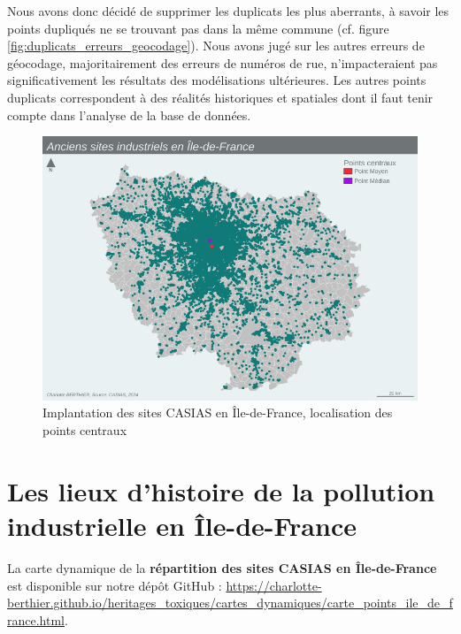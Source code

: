 \documentclass[a4paper,twoside,12pt]{book}
\begin{document}
Nous avons donc décidé de supprimer les duplicats les plus aberrants, à savoir les points dupliqués ne se trouvant pas dans la même commune (cf. figure \ref{fig:duplicats_erreurs_geocodage}). Nous avons jugé sur les autres erreurs de géocodage, majoritairement des erreurs de numéros de rue, n'impacteraient pas significativement les résultats des modélisations ultérieures. Les autres points duplicats correspondent à des réalités historiques et spatiales dont il faut tenir compte dans l'analyse de la base de données. 

\begin{landscape}
\begin{figure}[htbp]
\centering 
\hspace*{-2cm}\vspace*{+2cm}\includegraphics[width=1.35\textwidth]{img/chapitre3/CASIAS_Carte_IDF_All_Points_fixe_Moyen_Median.png}
\caption{Implantation des sites CASIAS en Île-de-France, localisation des points centraux}
\label{fig:carte_points_casias_bleue_points_centraux}
\end{figure}
\end{landscape}


\section{Les lieux d'histoire de la pollution industrielle en Île-de-France}

\begin{tcolorbox}[colback=gray!5!white,colframe=gray!20!white]
La carte dynamique de la \textbf{répartition des sites CASIAS en Île-de-France} est disponible sur notre dépôt GitHub : \url{https://charlotte-berthier.github.io/heritages_toxiques/cartes_dynamiques/carte_points_ile_de_france.html}.
\end{tcolorbox}
\end{document}
